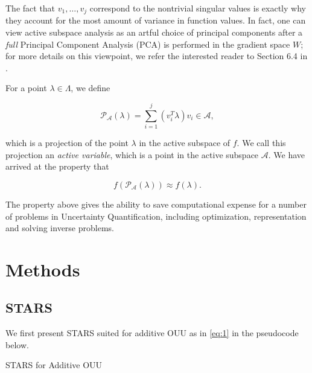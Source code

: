 \documentclass{amsart}
\newcommand{\A}{\mathcal{A}}
\begin{document}
The fact that $v_1,\ldots,v_{j}$ correspond to the nontrivial singular values is exactly why they account for the most amount of variance in function values. In fact, one can view active subspace analysis as an artful choice of principal components after a \textit{full} Principal Component Analysis (PCA) is performed in the gradient space $W$; for more details on this viewpoint, we refer the interested reader to Section 6.4 in \cite{Russi}.

For a point $\lambda \in \Lambda$, we define

\begin{equation} \label{eq:6}
  \mathcal{P}_\A(\lambda)=\sum_{i=1}^{j}\left( v_i^T \lambda\right)v_i \in \A, 
\end{equation}

\noindent which is a projection of the point $\lambda$ in the active subspace of $f$. We call this projection an \textit{active variable}, which is a point in the active subspace $\A$. We have arrived at the property that 

\begin{equation} \label{eq:7}
f\left(\mathcal{P}_\A(\lambda)\right) \approx f(\lambda).
\end{equation}

The property above gives the ability to save computational expense for a number of problems in Uncertainty Quantification, including optimization, representation and solving inverse problems. 





\section{Methods}

\subsection{STARS}

We first present STARS suited for additive OUU as in \eqref{eq:1} in the  pseudocode below.

\vspace{.25cm}


\begin{algorithm}[H]

\SetAlgoLined

 


	\caption{STARS for Additive OUU}

\end{algorithm}
\end{document}
